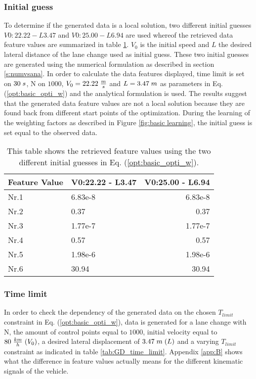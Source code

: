 \subsubsection{Initial guess}
To determine if the generated data is a local solution, two different initial guesses $V0:22.22 - L3.47$ and $V0:25.00 - L6.94$ are used whereof the retrieved data feature values are summarized in table \ref{tab:GD_local_test}. $V_0$ is the initial speed and $L$ the desired lateral distance of the lane change used as initial guess. These two initial guesses are generated using the numerical formulation as described in section \ref{s:numvsana}. In order to calculate the data features displayed, time limit is set on $30\hspace{1mm}s$, N on $1000$, $V_{0} = 22.22\hspace{1mm}\frac{m}{s}$ and $L = 3.47\hspace{1mm}m$ as parameters in Eq. (\ref{opt:basic_opti_w}) and the analytical formulation is used. The results suggest that the generated data feature values are not a local solution because they are found back from different start points of the optimization. During the learning of the weighting factors as described in Figure \ref{fig:basic learning}, the initial guess is set equal to the observed data. 

\begin{table}[h!]
	\centering
	\begin{tabular}{@{}llr@{}} \toprule
		\textbf{Feature Value}     & V0:22.22 - L3.47 & V0:25.00 - L6.94\\ \midrule
		Nr.1       & 6.83e-8   & 6.83e-8 \\
		Nr.2       & 0.37        & 0.37  \\
		Nr.3       & 1.77e-7     & 1.77e-7 \\
		Nr.4       & 0.57    & 0.57  \\
		Nr.5       & 1.98e-6     & 1.98e-6 \\
		Nr.6       & 30.94      & 30.94\\ \bottomrule
	\end{tabular}
	\caption{This table shows the retrieved feature values using the two different  initial guesses in Eq. (\ref{opt:basic_opti_w}).}
	\label{tab:GD_local_test}
\end{table}
\newpage
\subsubsection{Time limit}
In order to check the dependency of the generated data on the chosen $T_{limit}$ constraint in Eq. (\ref{opt:basic_opti_w}), data is generated for a lane change with N, the amount of control points equal to $1000$, initial velocity equal to $80 \hspace{1 mm} \frac{km}{h}\hspace{1mm}(V_{0})$, a desired lateral displacement of $3.47\hspace{1mm}m\hspace{1mm}(L)$ and a varying $T_{limit}$ constraint as indicated in table \ref{tab:GD_time_limit}. Appendix \ref{app:B} shows what the difference in feature values actually means for the different kinematic signals of the vehicle.

